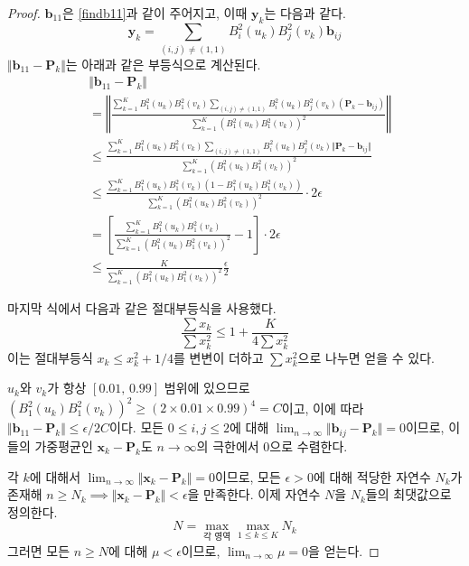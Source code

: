 \documentclass{Humantech_Paper_Awardfullpaper_hutech}
\begin{document}
\begin{proof}
	$\mathbf{b}_{11}$은 \eqref{findb11}과 같이 주어지고, 이때 $\mathbf{y}_k$는 다음과 같다.
	$$ \mathbf{y}_k = \sum_{(i, j) \neq (1, 1)} B_i^2(u_k) B_j^2(v_k) \mathbf{b}_{ij} $$ $\Vert \mathbf{b}_{11} - \mathbf{P}_k \Vert$는 아래과 같은 부등식으로 계산된다. 
	\begin{align*}
		&\Vert \mathbf{b}_{11} - \mathbf{P}_k \Vert \\
		&= \left\Vert \frac{\sum_{k=1}^K B_1^2(u_k) B_1^2(v_k) \sum_{(i, j) \neq (1, 1)} B_i^2(u_k) B_j^2(v_k) (\mathbf{P}_k - \mathbf{b}_{ij})}{\sum_{k=1}^K (B_1^2(u_k) B_1^2(v_k))^2} \right\Vert \\
		&\leq \frac{\sum_{k=1}^K B_1^2(u_k) B_1^2(v_k) \sum_{(i, j) \neq (1, 1)} B_i^2(u_k) B_j^2(v_k) \Vert \mathbf{P}_k - \mathbf{b}_{ij} \Vert}{\sum_{k=1}^K (B_1^2(u_k) B_1^2(v_k))^2} \\
		&\leq \frac{\sum_{k=1}^K B_1^2(u_k) B_1^2(v_k) (1 - B_1^2(u_k) B_1^2(v_k))}{\sum_{k=1}^K (B_1^2(u_k) B_1^2(v_k))^2} \cdot 2\epsilon \\
		&= \left[ \frac{\sum_{k=1}^K B_1^2(u_k) B_1^2(v_k)}{\sum_{k=1}^K (B_1^2(u_k) B_1^2(v_k))^2} - 1 \right] \cdot 2\epsilon \\
		&\leq \frac{K}{\sum_{k=1}^K (B_1^2(u_k) B_1^2(v_k))^2} \frac\epsilon2
	\end{align*}

	마지막 식에서 다음과 같은 절대부등식을 사용했다.
	$$ \frac{\sum x_k}{\sum x_k^2} \leq 1 + \frac{K}{4\sum x_k^2} $$
	이는 절대부등식 $x_k \leq x_k^2 + 1/4$를 변변이 더하고 $\sum x_k^2$으로 나누면 얻을 수 있다. 
	
	$u_k$와 $v_k$가 항상 $[0.01, \, 0.99]$ 범위에 있으므로 $(B_1^2(u_k) B_1^2(v_k))^2 \geq (2 \times 0.01 \times 0.99)^4 = C$이고, 이에 따라 $\Vert \mathbf{b}_{11} - \mathbf{P}_k \Vert \leq \epsilon / 2C$이다. 모든 $0 \leq i, j \leq 2$에 대해 $\lim_{n \to \infty} \Vert \mathbf{b}_{ij} - \mathbf{P}_k \Vert = 0$이므로, 이들의 가중평균인 $\mathbf{x}_k - \mathbf{P}_k$도 $n \to \infty$의 극한에서 $0$으로 수렴한다. 
	
	각 $k$에 대해서 $\lim_{n \to \infty} \Vert \mathbf{x}_k - \mathbf{P}_k \Vert = 0$이므로, 모든 $\epsilon > 0$에 대해 적당한 자연수 $N_k$가 존재해 $n \geq N_k \implies \Vert \mathbf{x}_k - \mathbf{P}_k \Vert < \epsilon$을 만족한다. 이제 자연수 $N$을 $N_k$들의 최댓값으로 정의한다. 
	$$ N = \max_{\text{각 영역}} \max_{1 \leq k \leq K} N_k $$
	그러면 모든 $n \geq N$에 대해 $\mu < \epsilon$이므로, $\lim_{n \to \infty} \mu = 0$을 얻는다. 
\end{proof}
\end{document}
